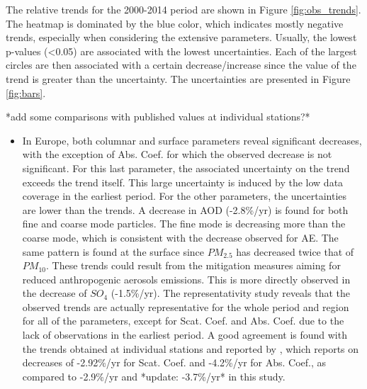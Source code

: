 \documentclass[journal abbreviation, manuscript]{copernicus}
\begin{document}
The relative trends for the 2000-2014 period are shown in Figure \ref{fig:obs_trends}. The heatmap is dominated by the blue color, which indicates mostly negative trends, especially when considering the extensive parameters. Usually, the lowest p-values (<0.05) are associated with the lowest uncertainties. Each of the largest circles are then associated with a certain decrease/increase since the value of the trend is greater than the uncertainty. The uncertainties are presented in Figure \ref{fig:bars}.

*add some comparisons with published values at individual stations?*
\begin{itemize}
 \item In Europe, both columnar and surface parameters reveal significant decreases, with the exception of Abs. Coef. for which the observed decrease is not significant. For this last parameter, the associated uncertainty on the trend exceeds the trend itself. This large uncertainty is induced by the low data coverage in the earliest period. For the other parameters, the uncertainties are lower than the trends. A decrease in AOD (-2.8\%/yr) is found for both fine and coarse mode particles. The fine mode is decreasing more than the coarse mode, which is consistent with the decrease observed for AE. The same pattern is found at the surface since $PM_{2.5}$ has decreased twice that of $PM_{10}$. These trends could result from the mitigation measures aiming for reduced anthropogenic aerosols emissions. This is more directly observed in the decrease of $SO_{4}$ (-1.5\%/yr). The representativity study reveals that the observed trends are actually representative for the whole period and region for all of the parameters, except for Scat. Coef. and Abs. Coef. due to the lack of observations in the earliest period. A good agreement is found with the trends obtained at individual stations and reported by \cite{collaudcoenprep}, which reports on decreases of -2.92\%/yr for Scat. Coef. and -4.2\%/yr for Abs. Coef., as compared to -2.9\%/yr and *update: -3.7\%/yr* in this study.

\end{itemize}
\end{document}
